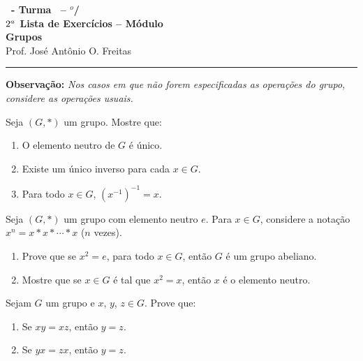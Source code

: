 \documentclass[12pt]{exam}
\begin{document}
    \begin{center}
    {\Large\bf \disciplina\ - Turma \turma\ -- \semestre$^{o}$/\ano} \\ \vspace{9pt} {\large\bf
        $2^a$ Lista de Exercícios -- Módulo \numeromodulo\\ Grupos}\\ \vspace{9pt} Prof. José Antônio O. Freitas
    \end{center}
    \hrule

    \vspace{.6cm}

    \textbf{Observação: }\textit{Nos casos em que não forem especificadas as operações do grupo, considere as operações usuais.}

    \vspace{.6cm}

    \questao{} Seja $(G,*)$ um grupo. Mostre que:
    \begin{enumerate}[label={\alph*})]
        \item O elemento neutro de $G$ é único.

        \item Existe um único inverso para cada $x \in G$.

        \item Para todo $x \in G$, $(x^{-1})^{-1} = x$.
    \end{enumerate}

    \vspace{.3cm}

    \questao{} Seja $(G,*)$ um grupo com elemento neutro $e$. Para $x\in
    G$, considere a notação $x^n=x*x*\cdots *x$ ($n$ vezes).
    \begin{enumerate}[label=({\alph*})]
        \item Prove que se
        $x^2 = e$, para todo $x\in G$, então $G$ é um grupo abeliano.

        \item Mostre que se $x\in G$ é tal que $x^2 = x$, então $x$ é o elemento neutro.
    \end{enumerate}

    \vspace{.3cm}

    \questao{} Sejam $G$ um grupo e $x$, $y$, $z \in G$. Prove que:
    \begin{enumerate}[label=({\alph*})]
        \item Se $xy = xz$, então $y = z$.

        \item Se $yx = zx$, então $y = z$.
    \end{enumerate}
\end{document}
